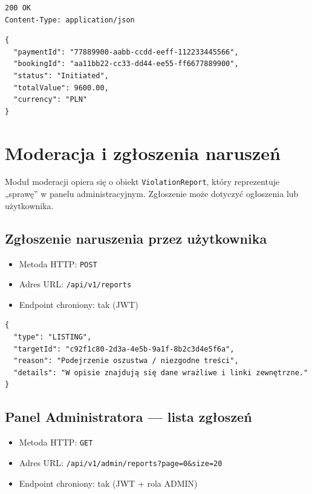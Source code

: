 \documentclass[11pt, a4paper]{article}
\begin{document}
\begin{itemize}
\begin{lstlisting}[style=http,caption={Odpowiedź HTTP — pobranie płatności po bookingId, sukces}]
200 OK
Content-Type: application/json
\end{lstlisting}

\begin{lstlisting}[style=json,caption={Ciało odpowiedzi — pobranie płatności po bookingId, sukces}]
{
  "paymentId": "77889900-aabb-ccdd-eeff-112233445566",
  "bookingId": "aa11bb22-cc33-dd44-ee55-ff6677889900",
  "status": "Initiated",
  "totalValue": 9600.00,
  "currency": "PLN"
}
\end{lstlisting}




\section{Moderacja i zgłoszenia naruszeń}
Moduł moderacji opiera się o obiekt \texttt{ViolationReport}, który reprezentuje „sprawę” w panelu administracyjnym. Zgłoszenie może dotyczyć ogłoszenia lub użytkownika.

\subsection{Zgłoszenie naruszenia przez użytkownika}
\begin{itemize}
    \item Metoda HTTP: \texttt{POST}
    \item Adres URL: \texttt{/api/v1/reports}
    \item Endpoint chroniony: tak (JWT)
\end{itemize}

\begin{lstlisting}[style=json,caption={Ciało żądania — zgłoszenie naruszenia}]
{
  "type": "LISTING", 
  "targetId": "c92f1c80-2d3a-4e5b-9a1f-8b2c3d4e5f6a",
  "reason": "Podejrzenie oszustwa / niezgodne treści",
  "details": "W opisie znajdują się dane wrażliwe i linki zewnętrzne."
}
\end{lstlisting}

\subsection{Panel Administratora — lista zgłoszeń}
\begin{itemize}
    \item Metoda HTTP: \texttt{GET}
    \item Adres URL: \texttt{/api/v1/admin/reports?page=0\&size=20}
    \item Endpoint chroniony: tak (JWT + rola ADMIN)
\end{itemize}


\end{itemize}
\end{document}
